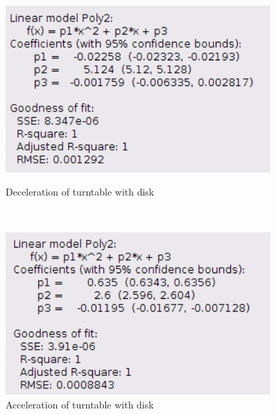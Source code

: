    \begin{figure}[H]
    \centering
    \begin{minipage}{0.45\textwidth}
        \includegraphics[width=0.9\textwidth]{images/21info}
        \caption{Deceleration of turntable with disk}\label{21info}
    \end{minipage}
    ~
    \begin{minipage}{0.45\textwidth}
        \includegraphics[width=0.9\textwidth]{images/22info}
        \caption{Acceleration of turntable with disk}\label{22info}
    \end{minipage}
    \end{figure}

